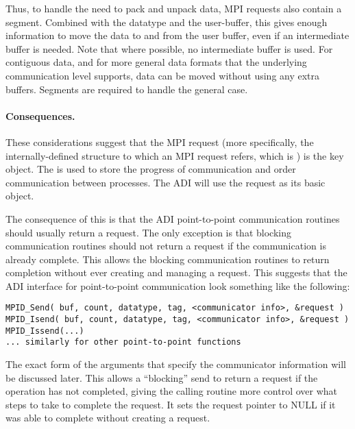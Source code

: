 Thus, to handle the need to pack and unpack data, MPI requests also
contain a segment.  Combined with the datatype and the user-buffer,
this gives enough information to move the data to and from the user
buffer, even if an intermediate buffer is needed.  Note that where
possible, no intermediate buffer is used.  For contiguous data, and
for more general data formats that the underlying communication level
supports, data can be moved without using any extra buffers.  Segments
are required to handle the general case.  

\paragraph{Consequences.}
These considerations suggest that the MPI request (more
specifically, the internally-defined structure to which an MPI
request refers, which is ) is the key object.  The
 is used to store the progress of communication and
order communication between processes.  The ADI will use the request
as its basic object.

The
consequence of this is that the ADI point-to-point communication routines
should usually return a request.  The only exception is that blocking
communication routines should not return a request if the
communication is already complete.  This allows
the blocking communication routines to
return completion without ever creating and managing a request.
This suggests that the ADI interface for point-to-point communication
look something like the following: 

\begin{small}
\begin{verbatim}
MPID_Send( buf, count, datatype, tag, <communicator info>, &request )
MPID_Isend( buf, count, datatype, tag, <communicator info>, &request )
MPID_Issend(...)
... similarly for other point-to-point functions
\end{verbatim}
\end{small}

\noindent
The exact form of the arguments that specify the communicator
information will be discussed later.
This allows a ``blocking'' send to return a request if the operation
has not completed, giving the calling routine more control over
what steps to take to complete the request.  It sets the request
pointer to NULL if it was able to complete without creating a request.


